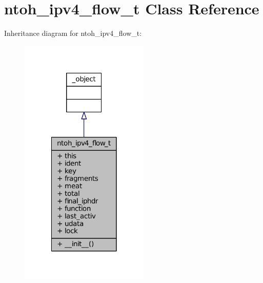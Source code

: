 \hypertarget{classlibntoh_1_1ntoh__ipv4__flow__t}{\section{ntoh\-\_\-ipv4\-\_\-flow\-\_\-t Class Reference}
\label{classlibntoh_1_1ntoh__ipv4__flow__t}
}


Inheritance diagram for ntoh\-\_\-ipv4\-\_\-flow\-\_\-t\-:
\nopagebreak
\begin{figure}[H]
\begin{center}
\leavevmode
\includegraphics[width=174pt]{classlibntoh_1_1ntoh__ipv4__flow__t__inherit__graph}
\end{center}
\end{figure}


